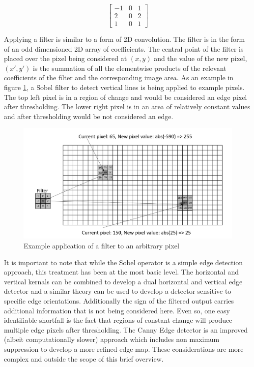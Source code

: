 \documentclass{article}
\begin{document}
	\begin{equation}\label{sobelOp}
		\begin{bmatrix} 
		-1 & 0 & 1 \\ 
		2 & 0 & 2 \\ 
		1 & 0 & 1  
		\end{bmatrix}
	\end{equation}
	 	 
	 Applying a filter is similar to a form of 2D convolution. The filter is in the form of an odd dimensioned 2D array of coefficients. The central point of the filter is placed over the pixel being considered at $(x,y)$ and the value of the new pixel,  $(x',y')$ is the summation of all the elementwise products of the relevant coefficients of the filter and the corresponding image area. As an example in figure \ref{filter}, a Sobel filter to detect vertical lines is being applied to example pixels. The top left pixel is in a region of change and would be considered an edge pixel after thresholding. The lower right pixel is in an area of relatively constant values and after thresholding would be not considered an edge.
	
	\begin{figure}
		\centering
		\includegraphics[width=5.0in]{filter}
		\caption{Example application of a filter to an arbitrary pixel}
		\label{filter}
	\end{figure}

	It is important to note that while the Sobel operator is a simple edge detection approach, this treatment has been at the most basic level. The horizontal and vertical kernals can be combined to develop a dual horizontal and vertical edge detector and a similar theory can be used to develop a detector sensitive to specific edge orientations. Additionally the sign of the filtered output carries additional information that is not being considered here. Even so, one easy identifiable shortfall is the fact that regions of constant change will produce multiple edge pixels after thresholding. The Canny Edge detector is an improved (albeit computationally slower) approach which includes non maximum suppression to develop a more refined edge map. These considerations are more complex and outside the scope of this brief overview.	
	
\end{document}
